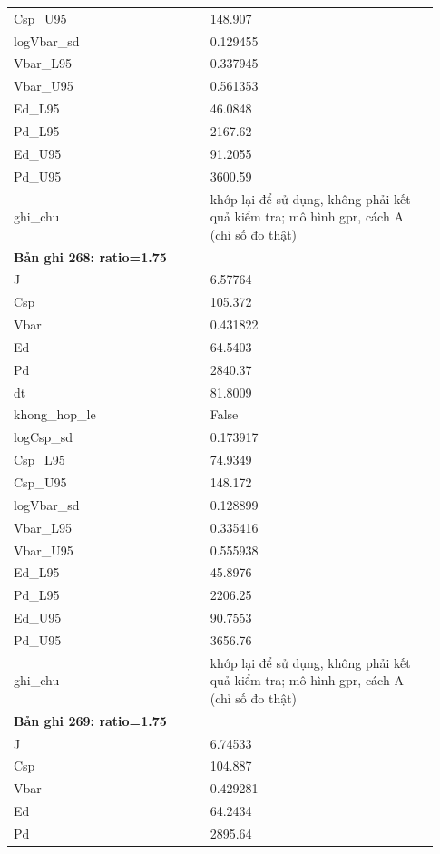 \begin{longtable}{p{0.43\linewidth}p{0.50\linewidth}}
Csp\_\allowbreak U95 & 148.907 \\
logVbar\_\allowbreak sd & 0.129455 \\
Vbar\_\allowbreak L95 & 0.337945 \\
Vbar\_\allowbreak U95 & 0.561353 \\
Ed\_\allowbreak L95 & 46.0848 \\
Pd\_\allowbreak L95 & 2167.62 \\
Ed\_\allowbreak U95 & 91.2055 \\
Pd\_\allowbreak U95 & 3600.59 \\
ghi\_\allowbreak chu & khớp lại để sử dụng, không phải kết quả kiểm tra; mô hình gpr, cách A (chỉ số đo thật) \\
\midrule
\multicolumn{2}{p{0.95\linewidth}}{\textbf{Bản ghi 268: ratio=1.75}} \\
J & 6.57764 \\
Csp & 105.372 \\
Vbar & 0.431822 \\
Ed & 64.5403 \\
Pd & 2840.37 \\
dt & 81.8009 \\
khong\_\allowbreak hop\_\allowbreak le & False \\
logCsp\_\allowbreak sd & 0.173917 \\
Csp\_\allowbreak L95 & 74.9349 \\
Csp\_\allowbreak U95 & 148.172 \\
logVbar\_\allowbreak sd & 0.128899 \\
Vbar\_\allowbreak L95 & 0.335416 \\
Vbar\_\allowbreak U95 & 0.555938 \\
Ed\_\allowbreak L95 & 45.8976 \\
Pd\_\allowbreak L95 & 2206.25 \\
Ed\_\allowbreak U95 & 90.7553 \\
Pd\_\allowbreak U95 & 3656.76 \\
ghi\_\allowbreak chu & khớp lại để sử dụng, không phải kết quả kiểm tra; mô hình gpr, cách A (chỉ số đo thật) \\
\midrule
\multicolumn{2}{p{0.95\linewidth}}{\textbf{Bản ghi 269: ratio=1.75}} \\
J & 6.74533 \\
Csp & 104.887 \\
Vbar & 0.429281 \\
Ed & 64.2434 \\
Pd & 2895.64 \\

\end{longtable}

